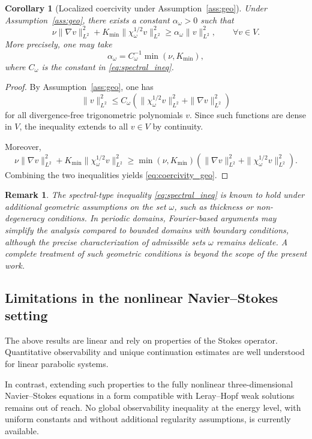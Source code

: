 \documentclass[preprint,12pt]{elsarticle}
\newtheorem{remark}[theorem]{Remark}
\newtheorem{corollary}[theorem]{Corollary}
\begin{document}
\begin{corollary}[Localized coercivity under Assumption~\ref{ass:geo}]
\label{cor:localized_coercivity_geo}
Under Assumption~\ref{ass:geo}, there exists a constant $\alpha_\omega>0$ such that
\begin{equation}
\label{eq:coercivity_geo}
\nu\|\nabla v\|_{L^2}^2
+
K_{\min}\|\chi_\omega^{1/2}v\|_{L^2}^2
\ge
\alpha_\omega \|v\|_{L^2}^2,
\qquad \forall v\in V.
\end{equation}
More precisely, one may take
\[
\alpha_\omega = C_\omega^{-1}\min(\nu,K_{\min}),
\]
where $C_\omega$ is the constant in \eqref{eq:spectral_ineq}.
\end{corollary}

\begin{proof}
By Assumption~\ref{ass:geo}, one has
\[
\|v\|_{L^2}^2
\le
C_\omega
\left(
\|\chi_\omega^{1/2}v\|_{L^2}^2
+
\|\nabla v\|_{L^2}^2
\right)
\]
for all divergence-free trigonometric polynomials $v$.
Since such functions are dense in $V$, the inequality extends to all
$v\in V$ by continuity.

Moreover,
\[
\nu\|\nabla v\|_{L^2}^2
+
K_{\min}\|\chi_\omega^{1/2}v\|_{L^2}^2
\ge
\min(\nu,K_{\min})
\left(
\|\nabla v\|_{L^2}^2
+
\|\chi_\omega^{1/2}v\|_{L^2}^2
\right).
\]
Combining the two inequalities yields \eqref{eq:coercivity_geo}.
\end{proof}

\begin{remark}
The spectral-type inequality \eqref{eq:spectral_ineq} is known to hold under
additional geometric assumptions on the set $\omega$, such as thickness or
non-degeneracy conditions.
In periodic domains, Fourier-based arguments may simplify the analysis compared
to bounded domains with boundary conditions, although the precise characterization
of admissible sets $\omega$ remains delicate.
A complete treatment of such geometric conditions is beyond the scope of the
present work.
\end{remark}

\subsection{Limitations in the nonlinear Navier--Stokes setting}

The above results are linear and rely on properties of the Stokes operator.
Quantitative observability and unique continuation estimates are well understood
for linear parabolic systems.

In contrast, extending such properties to the fully nonlinear
three-dimensional Navier--Stokes equations in a form compatible with
Leray--Hopf weak solutions remains out of reach.
No global observability inequality at the energy level, with uniform constants
and without additional regularity assumptions, is currently available.
\end{document}
